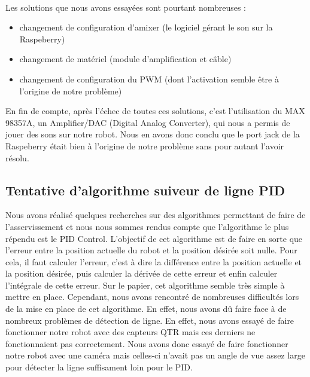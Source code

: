 \\
Les solutions que nous avons essayées sont pourtant nombreuses :
\begin{itemize}
    \item changement de configuration d'amixer (le logiciel gérant le son sur la Raspeberry)
    \item changement de matériel (module d'amplification et câble)
    \item changement de configuration du PWM (dont l'activation semble être à l'origine de notre problème)
\end{itemize}
En fin de compte, après l'échec de toutes ces solutions, c'est l'utilisation du MAX 98357A, un Amplifier/DAC (Digital Analog Converter), qui nous a permis de jouer des sons sur notre robot. Nous en avons donc conclu que le port jack de la Raspeberry était bien à l'origine de notre problème sans pour autant l'avoir résolu.

\subsection{Tentative d'algorithme suiveur de ligne PID}
Nous avons réalisé quelques recherches sur des algorithmes permettant de faire de l'asservissement et nous nous sommes rendus compte que l'algorithme le plus répendu est le PID Control.
L'objectif de cet algorithme est de faire en sorte que l'erreur entre la position actuelle du robot et la position désirée soit nulle. Pour cela, il faut calculer l'erreur, c'est à dire la différence entre la position actuelle et la position désirée, puis calculer la dérivée de cette erreur et enfin calculer l'intégrale de cette erreur.
Sur le papier, cet algorithme semble très simple à mettre en place. Cependant, nous avons rencontré de nombreuses difficultés lors de la mise en place de cet algorithme.
En effet, nous avons dû faire face à de nombreux problèmes de détection de ligne. En effet, nous avons essayé de faire fonctionner notre robot avec des capteurs QTR mais ces derniers ne fonctionnaient pas correctement. Nous avons donc essayé de faire fonctionner notre robot avec une caméra mais celles-ci n'avait pas un angle de vue assez large pour détecter la ligne suffisament loin pour le PID.

